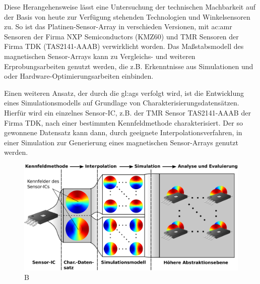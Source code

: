 Diese Herangehensweise lässt eine Untersuchung der technischen Machbarkeit auf der Basis von heute zur Verfügung stehenden Technologien und Winkelsensoren zu.
So ist das Platinen-Sensor-Array in verschieden Versionen, mit \gls{ac:amr} Sensoren der Firma NXP Semiconductors (KMZ60) \cite{NXPSemiconductors2014} und TMR Sensoren der Firma TDK (TAS2141-AAAB) \cite{TDK2016} verwirklicht worden. Das Maßstabsmodell des magnetischen Sensor-Arrays kann zu Vergleichs- und weiteren Erprobungsarbeiten genutzt werden, die z.B. Erkenntnisse aus Simulationen und oder Hardware-Optimierungsarbeiten einbinden.

Einen weiteren Ansatz, der durch die \gls{gl:ags} verfolgt wird, ist die Entwicklung eines Simulationsmodells auf Grundlage von Charakterisierungsdatensätzen. Hierfür wird ein einzelnes Sensor-IC, z.B. der TMR Sensor TAS2141-AAAB der Firma TDK, nach einer bestimmten Kennfeldmethode \cite{Schuethe2019} charakterisiert. Der so gewonnene Datensatz kann dann, durch geeignete Interpolationsverfahren, in einer Simulation zur Generierung eines magnetischen Sensor-Arrays genutzt werden.


\begin{figure}[tbph]
	\centering
	\includegraphics[width=\linewidth]{chapters/images/Ansatz_Simulationsmodell}
	\caption[A]{B}
	\label{fig:ansatzsimulationsmodell}
\end{figure}


